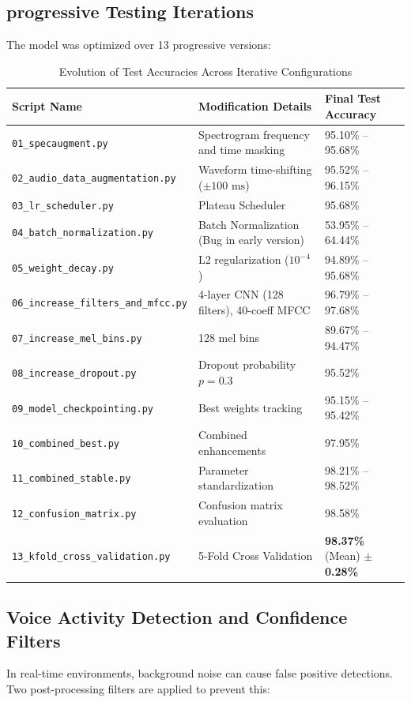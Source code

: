 \subsection{progressive Testing Iterations}
The model was optimized over 13 progressive versions:
\begin{table}[H]
\centering
\caption{Evolution of Test Accuracies Across Iterative Configurations}
\begin{tabular}{lll}
\toprule
\textbf{Script Name} & \textbf{Modification Details} & \textbf{Final Test Accuracy} \\
\midrule
\texttt{01\_specaugment.py} & Spectrogram frequency and time masking & 95.10\% -- 95.68\% \\
\texttt{02\_audio\_data\_augmentation.py} & Waveform time-shifting ($\pm 100\text{ ms}$) & 95.52\% -- 96.15\% \\
\texttt{03\_lr\_scheduler.py} & Plateau Scheduler & 95.68\% \\
\texttt{04\_batch\_normalization.py} & Batch Normalization (Bug in early version) & 53.95\% -- 64.44\% \\
\texttt{05\_weight\_decay.py} & L2 regularization ($10^{-4}$) & 94.89\% -- 95.68\% \\
\texttt{06\_increase\_filters\_and\_mfcc.py} & 4-layer CNN (128 filters), 40-coeff MFCC & 96.79\% -- 97.68\% \\
\texttt{07\_increase\_mel\_bins.py} & 128 mel bins & 89.67\% -- 94.47\% \\
\texttt{08\_increase\_dropout.py} & Dropout probability $p=0.3$ & 95.52\% \\
\texttt{09\_model\_checkpointing.py} & Best weights tracking & 95.15\% -- 95.42\% \\
\texttt{10\_combined\_best.py} & Combined enhancements & 97.95\% \\
\texttt{11\_combined\_stable.py} & Parameter standardization & 98.21\% -- 98.52\% \\
\texttt{12\_confusion\_matrix.py} & Confusion matrix evaluation & 98.58\% \\
\texttt{13\_kfold\_cross\_validation.py} & 5-Fold Cross Validation & \textbf{98.37\%} (Mean) $\pm$ \textbf{0.28\%} \\
\bottomrule
\end{tabular}
\label{tab:pytorch_testing_history}
\end{table}

\subsection{Voice Activity Detection and Confidence Filters}
In real-time environments, background noise can cause false positive detections. Two post-processing filters are applied to prevent this:

